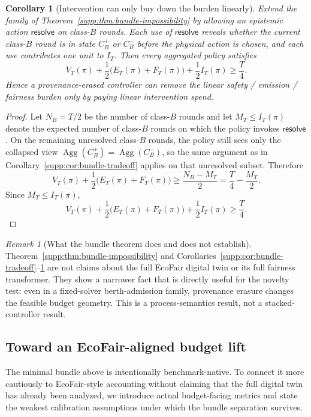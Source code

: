 \documentclass[11pt]{article}
\newcommand{\Agg}{\operatorname{Agg}}
\newcommand{\1}{\mathbf{1}}
\theoremstyle{definition}
\theoremstyle{plain}
\newtheorem{corollary}[definition]{Corollary}
\theoremstyle{remark}
\newtheorem{remark}[definition]{Remark}
\begin{document}
\begin{corollary}[Intervention can only buy down the burden linearly]
\label{supp:cor:intervention-tradeoff}
Extend the family of Theorem~\ref{supp:thm:bundle-impossibility} by allowing an epistemic action $\mathsf{resolve}$ on class-$B$ rounds. Each use of $\mathsf{resolve}$ reveals whether the current class-$B$ round is in state $C_B^+$ or $C_B^-$ before the physical action is chosen, and each use contributes one unit to $I_T$. Then every aggregated policy satisfies
\[
V_T(\pi)+\frac{1}{2}\big(E_T(\pi)+F_T(\pi)\big)+\frac{1}{2}I_T(\pi)
\ge \frac{T}{4}.
\]
Hence a provenance-erased controller can remove the linear safety / emission / fairness burden only by paying linear intervention spend.
\end{corollary}

\begin{proof}
Let $N_B=T/2$ be the number of class-$B$ rounds and let $M_T\le I_T(\pi)$ denote the expected number of class-$B$ rounds on which the policy invokes $\mathsf{resolve}$. On the remaining unresolved class-$B$ rounds, the policy still sees only the collapsed view $\Agg(C_B^+)=\Agg(C_B^-)$, so the same argument as in Corollary~\ref{supp:cor:bundle-tradeoff} applies on that unresolved subset. Therefore
\[
V_T(\pi)+\frac{1}{2}\big(E_T(\pi)+F_T(\pi)\big)
\ge \frac{N_B-M_T}{2}
= \frac{T}{4}-\frac{M_T}{2}.
\]
Since $M_T\le I_T(\pi)$,
\[
V_T(\pi)+\frac{1}{2}\big(E_T(\pi)+F_T(\pi)\big)+\frac{1}{2}I_T(\pi)
\ge \frac{T}{4}.
\]
\end{proof}

\begin{remark}[What the bundle theorem does and does not establish]
\label{supp:rem:bundle-scope}
Theorem~\ref{supp:thm:bundle-impossibility} and Corollaries~\ref{supp:cor:bundle-tradeoff}--\ref{supp:cor:intervention-tradeoff} are not claims about the full EcoFair digital twin or its full fairness transformer. They show a narrower fact that is directly useful for the novelty test: even in a fixed-solver berth-admission family, provenance erasure changes the feasible budget geometry. This is a process-semantics result, not a stacked-controller result.
\end{remark}

\subsection{Toward an EcoFair-aligned budget lift}
\label{supp:subsec:budget-lift}

The minimal bundle above is intentionally benchmark-native. To connect it more cautiously to EcoFair-style accounting without claiming that the full digital twin has already been analyzed, we introduce actual budget-facing metrics and state the weakest calibration assumptions under which the bundle separation survives.
\end{document}
